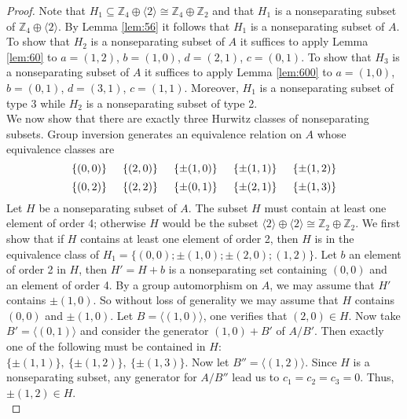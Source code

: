 \documentclass[article,dvisp]{amsart}
\def\Z{\mathbb{Z}}
\theoremstyle{definition}
\theoremstyle{remark}
\numberwithin{equation}{section}
\theoremstyle{lemma}
\begin{document}
\begin{proof} Note that $H_{1}\subseteq \Z_{4}\oplus\langle2\rangle\cong\Z_{4}\oplus\Z_{2}$ and that $H_{1}$ is a nonseparating subset of $\Z_{4}\oplus\langle2\rangle$. By Lemma \ref{lem:56} it follows that $H_{1}$ is a nonseparating subset of $A$. To show that $H_{2}$ is a nonseparating subset of $A$ it suffices to apply Lemma \ref{lem:60} to $a=(1,2)$, $b=(1,0)$, $d=(2,1)$, $c=(0,1)$. To show that $H_{3}$ is a nonseparating subset of $A$ it suffices to apply Lemma \ref{lem:600} to $a=(1,0)$, $b=(0,1)$, $d=(3,1)$, $c=(1,1)$. Moreover, $H_{1}$ is a nonseparating subset of type 3 while $H_{2}$ is a nonseparating subset of type 2.\\

We now show that there are exactly three Hurwitz classes of nonseparating subsets. Group inversion generates an equivalence relation on $A$ whose equivalence classes are 
$$\{(0,0)\}\hspace{.2in}\{(2,0)\}\hspace{.2in}\{\pm(1,0)\}\hspace{.2in}\{\pm(1,1)\}\hspace{.2in}\{\pm(1,2)\}$$
$$\{(0,2)\}\hspace{.2in}\{(2,2)\}\hspace{.2in}\{\pm(0,1)\}\hspace{.2in}\{\pm(2,1)\}\hspace{.2in}\{\pm(1,3)\}$$
Let $H$ be a nonseparating subset of $A$. The subset $H$ must contain at least one element of order 4; otherwise $H$ would be the subset $\langle 2\rangle\oplus\langle 2\rangle\cong\Z_{2}\oplus\Z_{2}$. We first show that if $H$ contains at least one element of order 2, then $H$ is in the equivalence class of $H_{1}=\{(0,0);\pm(1,0);\pm(2,0);(1,2)\}$. Let $b$ an element of order 2 in $H$, then $H'=H+b$ is a nonseparating set containing $(0,0)$ and an element of order 4. By a group automorphism on $A$, we may assume that $H'$ contains $\pm(1,0)$. So without loss of generality we may assume that $H$ contains $(0,0)$ and $\pm(1,0)$. Let $B=\langle(1,0)\rangle$, one verifies that $(2,0)\in H$. Now take $B'=\langle(0,1)\rangle$ and consider the generator $(1,0)+B'$ of $A/B'$. Then exactly one of the following must be contained in $H$: 
$\{\pm(1,1)\},\ \{\pm(1,2)\},\ \{\pm(1,3)\}$. Now let $B''=\langle(1,2)\rangle$. Since $H$ is a nonseparating subset, any generator for $A/B''$ lead us to $c_{1}=c_{2}=c_{3}=0$. Thus, $\pm(1,2)\in H$.\\


\end{proof}
\end{document}
